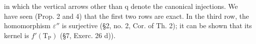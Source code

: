 in which the vertical arrows other than q denote the canonical injections. We have seen (Prop. 2 and 4) that the first two rows are exact. In the third row, the homomorphism \(\varepsilon''\) is surjective (§2, no. 2, Cor. of Th. 2); it can be shown that its kernel is \(f'(\mathrm{T}_{\mathrm{P}})\) (§7, Exerc. 26 d)).

